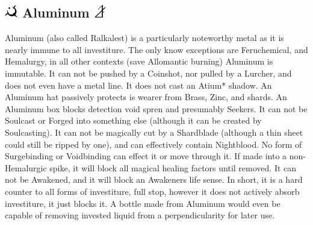 \documentclass[conference]{IEEEtran}
\begin{document}
\subsection*{\includegraphics[height=1em]{images/Aluminum.png}  Aluminum \includegraphics[height=1em]{images/Aluminum_(Feruchemy).png}}
Aluminum (also called Ralkalest\cite{RoW-CH37}) is a particularly noteworthy metal as it is nearly immune to all investiture.\cite{al-universal}  The only know exceptions are Feruchemical,\cite{FE-TB} and Hemalurgy,\cite{HE-TB} in all other contexts (save Allomantic burning\cite{AL-TB}) Aluminum is immutable.  It can not be pushed by a Coinshot, nor pulled by a Lurcher,\cite{ARS} and does not even have a metal line.\cite{BoM-CH6}  It does not cast an Atium* shadow.\cite{al-atium} An Aluminum hat passively protects is wearer from Brass, Zinc,\cite{AoL-CH3} and shards.\cite{al-shard}  An Aluminum box blocks detection void spren\cite{RoW-CH81} and presumably Seekers.  It can not be Soulcast\cite{al-cast} or Forged\cite{al-forged} into something else (although it can be created by Soulcasting\cite{WoR-CH48}).  It can not be magically cut by a Shardblade\cite{RoW-E17} (although a thin sheet could still be ripped by one\cite{RoW-shardblade-wob}), and can effectively contain Nightblood\cite{al-night}.  No form of Surgebinding\cite{RoW-E17}\cite{al-surge} or Voidbinding can effect it or move through it.\cite{RoW-CH37}  If made into a non-Hemalurgic spike, it will block all magical healing factors until removed.\cite{al-hf}  It can not be Awakened,\cite{al-awake} and it will block an Awakeners life sense.\cite{seeker-spren}  In short, it is a hard counter to all forms of investiture, full stop, however it does not actively absorb investiture,\cite{al-awake} it just blocks it.  A bottle made from Aluminum would even be capable of removing invested liquid from a perpendicularity for later use.\cite{al-fluid}\\
\end{document}

